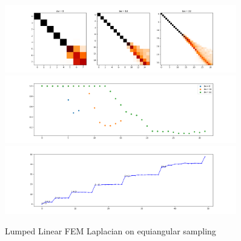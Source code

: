 \begin{figure}[h]
	\label{fig:FEMequiangularLumped}
	\caption{Lumped Linear FEM Laplacian on equiangular sampling}
	\centering
	\includegraphics[width=0.9\textwidth]{../codes/03.FEM_laplacian/equiangular/mass_lumping/BL/img/linearFEM.png}
	\includegraphics[width=0.9\textwidth]{../codes/03.FEM_laplacian/equiangular/mass_lumping/BL/img/linearFEM_diagonal.png}	
	\includegraphics[width=0.9\textwidth]{../codes/03.FEM_laplacian/equiangular/mass_lumping/BL/img/FEM_eigenvalues_32.png}	
\end{figure}

